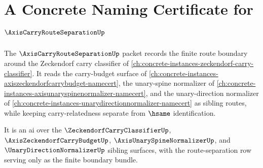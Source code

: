 \chapter{A Concrete Naming Certificate for $\AxisCarryRouteSeparationUp$}
\label{ch:concrete-instances-axis-carry-route-separation-namecert}

The $\AxisCarryRouteSeparationUp$ packet records the finite route boundary around the Zeckendorf carry classifier of \autoref{ch:concrete-instances-zeckendorf-carry-classifier}. It reads the carry-budget surface of \autoref{ch:concrete-instances-axiszeckendorfcarrybudget-namecert}, the unary-spine normalizer of \autoref{ch:concrete-instances-axisunaryspinenormalizer-namecert}, and the unary-direction normalizer of \autoref{ch:concrete-instances-unarydirectionnormalizer-namecert} as sibling routes, while keeping carry-relatedness separate from $\hsame$ identification.

It is an ai over the $\ZeckendorfCarryClassifierUp$, $\AxisZeckendorfCarryBudgetUp$, $\AxisUnarySpineNormalizerUp$, and $\UnaryDirectionNormalizerUp$ sibling surfaces, with the route-separation row serving only as the finite boundary bundle.


